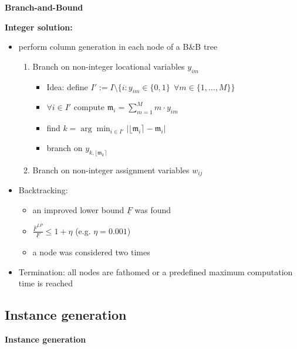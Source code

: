 \begin{frame}{\textbf{Branch-and-Bound}}

\textbf{Integer solution:}
\begin{itemize}
    \item perform column generation in each node of a B\&B tree
        \begin{enumerate}
            \item Branch on non-integer locational variables $y_{im}$
                \begin{itemize}
                    \item Idea: define $I':= I \setminus \{i: y_{im} \in \{0,1\} \ \ \forall m \in \{1,\dots,M\}\}$
                    \item $\forall i \in I'$ compute $ \mathfrak{m}_i = \sum_{m =1}^M m \cdot y_{im}$ 
                    \item find $k = \arg \min_{i\in I'}|\lfloor \mathfrak{m}_i \rceil- \mathfrak{m}_i|$ 
                    \item branch on $y_{k,\lfloor \mathfrak{m}_{k} \rceil}$
                \end{itemize}
            \item Branch on non-integer assignment variables $w_{ij}$
        \end{enumerate}
    \item Backtracking:
        \begin{itemize}
            \item an improved lower bound $\underline{F}$ was found
            \item $\frac{\overline{F}^{LP}}{\underline{F}} \leq 1 + \eta$ (e.g. $\eta = 0.001$)
            \item a node was considered two times
        \end{itemize}
    \item Termination: all nodes are fathomed or a predefined maximum computation time is reached
\end{itemize}
    
\end{frame}


\subsection{Instance generation}

\begin{frame}
\begin{center}
{\LARGE \textbf{Instance generation}}
\end{center}
\end{frame}

